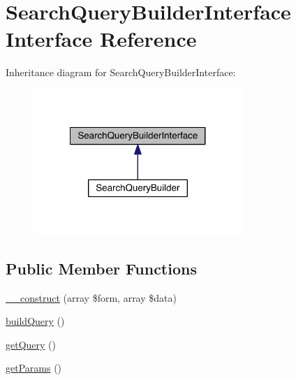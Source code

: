 \hypertarget{interfaceapp_1_1models_1_1core_1_1_search_1_1_search_query_builder_interface}{\section{Search\-Query\-Builder\-Interface Interface Reference}
\label{interfaceapp_1_1models_1_1core_1_1_search_1_1_search_query_builder_interface}
}


Inheritance diagram for Search\-Query\-Builder\-Interface\-:
\nopagebreak
\begin{figure}[H]
\begin{center}
\leavevmode
\includegraphics[width=224pt]{interfaceapp_1_1models_1_1core_1_1_search_1_1_search_query_builder_interface__inherit__graph}
\end{center}
\end{figure}
\subsection*{Public Member Functions}
\begin{DoxyCompactItemize}
\item 
\hyperlink{interfaceapp_1_1models_1_1core_1_1_search_1_1_search_query_builder_interface_a402e8ca92aeecf73ee3020f9c67ce7d3}{\-\_\-\-\_\-construct} (array \$form, array \$data)
\item 
\hyperlink{interfaceapp_1_1models_1_1core_1_1_search_1_1_search_query_builder_interface_a394445491b1b221e4e562dfb45f2a266}{build\-Query} ()
\item 
\hyperlink{interfaceapp_1_1models_1_1core_1_1_search_1_1_search_query_builder_interface_a55f162785567258fe5138af282e588c2}{get\-Query} ()
\item 
\hyperlink{interfaceapp_1_1models_1_1core_1_1_search_1_1_search_query_builder_interface_ae32cd7c32721b02d676bb63b4b1366db}{get\-Params} ()
\end{DoxyCompactItemize}



